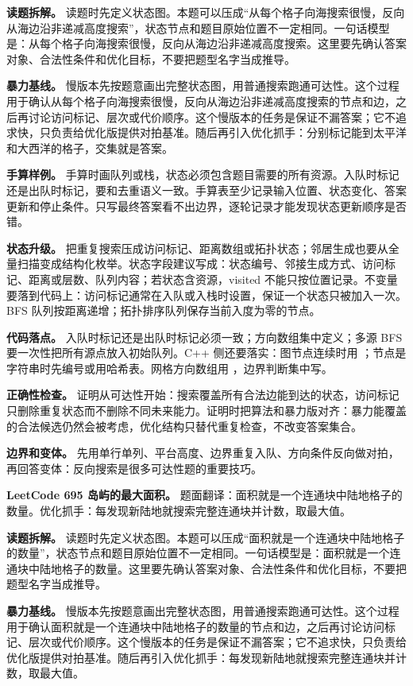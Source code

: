 \textbf{读题拆解。} 读题时先定义状态图。本题可以压成“从每个格子向海搜索很慢，反向从海边沿非递减高度搜索”，状态节点和题目原始位置不一定相同。一句话模型是：从每个格子向海搜索很慢，反向从海边沿非递减高度搜索。这里要先确认答案对象、合法性条件和优化目标，不要把题型名字当成推导。

\textbf{暴力基线。} 慢版本先按题意画出完整状态图，用普通搜索跑通可达性。这个过程用于确认从每个格子向海搜索很慢，反向从海边沿非递减高度搜索的节点和边，之后再讨论访问标记、层次或代价顺序。这个慢版本的任务是保证不漏答案；它不追求快，只负责给优化版提供对拍基准。随后再引入优化抓手：分别标记能到太平洋和大西洋的格子，交集就是答案。

\textbf{手算样例。} 手算时画队列或栈，状态必须包含题目需要的所有资源。入队时标记还是出队时标记，要和去重语义一致。手算表至少记录输入位置、状态变化、答案更新和停止条件。只写最终答案看不出边界，逐轮记录才能发现状态更新顺序是否错。

\textbf{状态升级。} 把重复搜索压成访问标记、距离数组或拓扑状态；邻居生成也要从全量扫描变成结构化枚举。状态字段建议写成：状态编号、邻接生成方式、访问标记、距离或层数、队列内容；若状态含资源，visited 不能只按位置记录。不变量要落到代码上：访问标记通常在入队或入栈时设置，保证一个状态只被加入一次。BFS 队列按距离递增；拓扑排序队列保存当前入度为零的节点。

\textbf{代码落点。} 入队时标记还是出队时标记必须一致；方向数组集中定义；多源 BFS 要一次性把所有源点放入初始队列。C++ 侧还要落实：图节点连续时用 ；节点是字符串时先编号或用哈希表。网格方向数组用 ，边界判断集中写。

\textbf{正确性检查。} 证明从可达性开始：搜索覆盖所有合法边能到达的状态，访问标记只删除重复状态而不删除不同未来能力。证明时把算法和暴力版对齐：暴力能覆盖的合法候选仍然会被考虑，优化结构只替代重复检查，不改变答案集合。

\textbf{边界和变体。} 先用单行单列、平台高度、边界重复入队、方向条件反向做对拍，再回答变体：反向搜索是很多可达性题的重要技巧。

\noindent\textbf{LeetCode 695 岛屿的最大面积。} 题面翻译：面积就是一个连通块中陆地格子的数量。优化抓手：每发现新陆地就搜索完整连通块并计数，取最大值。

\textbf{读题拆解。} 读题时先定义状态图。本题可以压成“面积就是一个连通块中陆地格子的数量”，状态节点和题目原始位置不一定相同。一句话模型是：面积就是一个连通块中陆地格子的数量。这里要先确认答案对象、合法性条件和优化目标，不要把题型名字当成推导。

\textbf{暴力基线。} 慢版本先按题意画出完整状态图，用普通搜索跑通可达性。这个过程用于确认面积就是一个连通块中陆地格子的数量的节点和边，之后再讨论访问标记、层次或代价顺序。这个慢版本的任务是保证不漏答案；它不追求快，只负责给优化版提供对拍基准。随后再引入优化抓手：每发现新陆地就搜索完整连通块并计数，取最大值。


